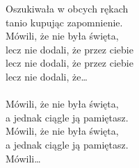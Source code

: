 \begin{text}
Oszukiwała w obcych rękach\\
tanio kupując zapomnienie.\\
Mówili, że nie była święta,\\
lecz nie dodali, że przez ciebie\\
lecz nie dodali, że przez ciebie\\
lecz nie dodali, że…\\
\vin\\

\vin Mówili, że nie była święta,\\
\vin a jednak ciągle ją pamiętasz.\\
\vin Mówili, że nie była święta,\\
\vin a jednak ciągle ją pamiętasz.\\
\vin Mówili… \\
\vin \\
\end{text}
